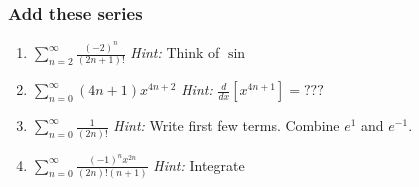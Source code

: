 \documentclass[14pt]{beamer}
\begin{document}
	\begin{frame}[t]
		\fontsize{13}{13}\selectfont
		\frametitle{Add these series}

		\begin{enumerate}
			\item $\displaystyle \sum_{n=2}^{\infty}\frac{(-2)^{n}}{(2n+1)!}$ \hfill \emph{Hint:}
				Think of $\sin$

				\vfill

			\item $\displaystyle \sum_{n=0}^{\infty}(4n+1){x^{4n+2}}$ \hfill \emph{Hint:}
				$\displaystyle \frac{d}{dx}\left[ x^{4n+1}\right] = ???$

				\vfill

			\item $\displaystyle \sum_{n=0}^{\infty}\frac{1}{(2n)!}$ \hfill \emph{Hint:}
				Write first few terms. Combine $\displaystyle e^{1}$ and $\displaystyle e
				^{-1}$.

				\vfill

			\item $\displaystyle \sum_{n=0}^{\infty}\frac{(-1)^{n}x^{2n}}{(2n)!(n+1)}$
				\hfill \emph{Hint:} Integrate %

				\vfill
		\end{enumerate}
	\end{frame}
\end{document}
